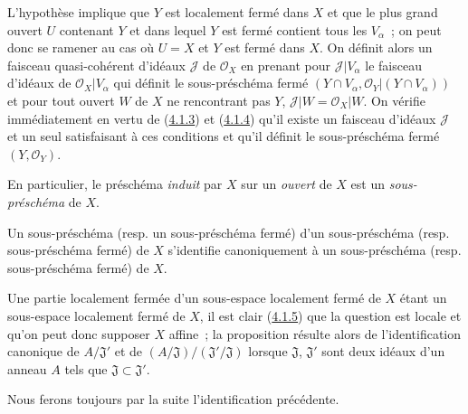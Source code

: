 L'hypothèse implique que $Y$ est localement fermé dans $X$ et que le plus
grand ouvert $U$ contenant $Y$ et dans lequel $Y$ est fermé contient tous les
$V_\alpha$~; on peut donc se ramener au cas où $U=X$ et $Y$ est fermé dans
$X$. On définit alors un faisceau quasi-cohérent d'idéaux $\mathscr{J}$ de
$\mathscr{O}_X$ en prenant pour $\mathscr{J}|V_\alpha$ le faisceau d'idéaux de
$\mathscr{O}_X|V_\alpha$ qui définit le sous-préschéma fermé
$(Y\cap V_\alpha,\mathscr{O}_Y|(Y\cap V_\alpha))$ et pour tout ouvert $W$ de
$X$ ne rencontrant pas $Y$, $\mathscr{J}|W=\mathscr{O}_X|W$. On vérifie
immédiatement en vertu de (\hyperref[I.4.1.3-fr]{4.1.3}) et
(\hyperref[I.4.1.4-fr]{4.1.4}) qu'il existe un faisceau d'idéaux $\mathscr{J}$
et un seul satisfaisant à ces conditions et qu'il définit le sous-préschéma
fermé $(Y,\mathscr{O}_Y)$.

En particulier, le préschéma \emph{induit} par $X$ sur un \emph{ouvert} de
$X$ est un \emph{sous-préschéma} de $X$.

\begin{proposition}[4.1.6]
\label{I.4.1.6-fr}
Un sous-préschéma (resp. un sous-préschéma fermé) d'un
sous-préschéma (resp. sous-préschéma fermé) de $X$
s'identifie canoniquement à un sous-préschéma (resp. sous-préschéma fermé) de
$X$.
\end{proposition}

Une partie localement fermée d'un sous-espace localement fermé de $X$ étant
un sous-espace localement fermé de $X$, il est clair
(\hyperref[I.4.1.5-fr]{4.1.5}) que la question est locale et qu'on peut donc
supposer $X$ affine~; la proposition résulte alors de l'identification
canonique de $A/\mathfrak{J}'$ et de
$(A/\mathfrak{J})/(\mathfrak{J}'/\mathfrak{J})$ lorsque
$\mathfrak{J}$, $\mathfrak{J}'$ sont deux idéaux d'un anneau $A$ tels que
$\mathfrak{J}\subset\mathfrak{J}'$.

Nous ferons toujours par la suite l'identification précédente.

